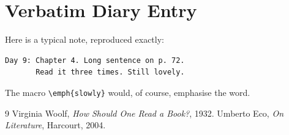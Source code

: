 \documentclass[11pt,letterpaper]{article}
\begin{document}
\section*{Verbatim Diary Entry}
Here is a typical note, reproduced exactly:
\begin{verbatim}
Day 9: Chapter 4. Long sentence on p. 72.
       Read it three times. Still lovely.
\end{verbatim}
The macro \verb+\emph{slowly}+ would, of course, emphasise the word.

\begin{thebibliography}{9}
 Virginia Woolf, \emph{How Should One Read a Book?}, 1932.
 Umberto Eco, \emph{On Literature}, Harcourt, 2004.
\end{thebibliography}
\end{document}
